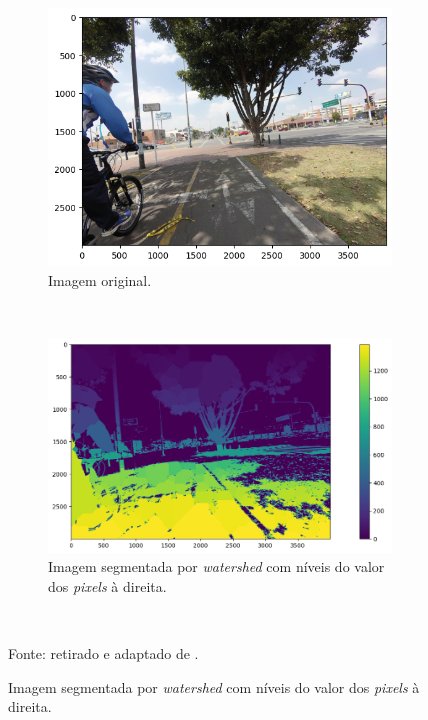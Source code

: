 \begin{figure}[H]
   \caption{Exemplos de segmentação com a aplicação de \textit{watershed}.}
   \centering
   \label{segment:fig:watershed_1}
    \begin{subfigure}[t]{0.5\textwidth}
        \centering
        \includegraphics[width=1\linewidth]{recursos/imagens/image_seg/original_watershed.png}
        \caption{Imagem original.}
        \label{segment:fig:watershed_1.1}
    \end{subfigure}%
    ~ 

    \begin{subfigure}[t]{0.5\textwidth}
        \centering
        \includegraphics[width=1\linewidth]{recursos/imagens/image_seg/segmented_watershed.png}
        \caption{Imagem segmentada por \textit{watershed} com níveis do valor dos \textit{pixels} à direita.}
        \label{segment:fig:watershed_1.2}
    \end{subfigure}%
    ~

    Fonte: retirado e adaptado de \cite{Neuhold2017_ICCV}.
\end{figure}

